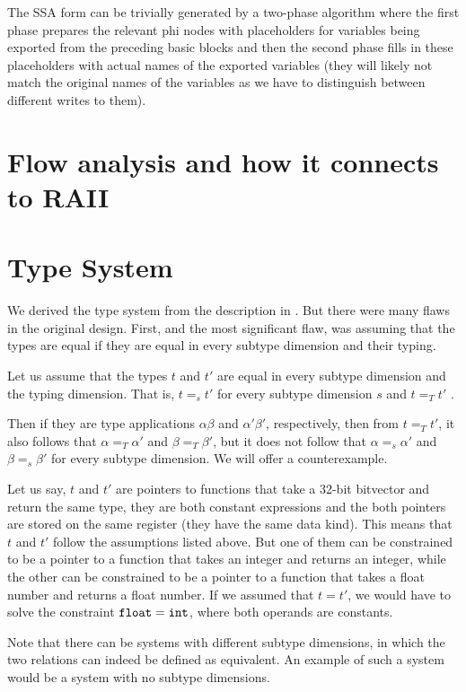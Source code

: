 The SSA form can be trivially generated by a two-phase algorithm where the first phase prepares the relevant phi nodes with placeholders for variables being exported from the preceding basic blocks and then the second phase fills in these placeholders with actual names of the exported variables (they will likely not match the original names of the variables as we have to distinguish between different writes to them).

\section{Flow analysis and how it connects to RAII}

\section{Type System}

We derived the type system from the description in . But there were many flaws in the original design. First, and the most significant flaw, was assuming that the types are equal if they are equal in every subtype dimension and their typing.

\begin{ex}
    Let us assume that the types $t$ and $t'$ are equal in every subtype dimension and the typing dimension. That is, $t =_s t'$ for every subtype dimension $s$ and $t =_T t'$ .

    Then if they are type applications $\alpha \beta$ and $\alpha' \beta'$, respectively, then from $t =_T t'$, it also follows that $\alpha =_T \alpha'$ and $\beta =_T \beta'$, but it does not follow that $\alpha =_s \alpha'$ and $\beta =_s \beta'$ for every subtype dimension. We will offer a counterexample.

    Let us say, $t$ and $t'$ are pointers to functions that take a 32-bit bitvector and return the same type, they are both constant expressions and the both pointers are stored on the same register (they have the same data kind). This means that $t$ and $t'$ follow the assumptions listed above. But one of them can be constrained to be a pointer to a function that takes an integer and returns an integer, while the other can be constrained to be a pointer to a function that takes a float number and returns a float number. If we assumed that $t = t'$, we would have to solve the constraint $\mathtt{float} = \mathtt{int}$, where both operands are constants.

    Note that there can be systems with different subtype dimensions, in which the two relations can indeed be defined as equivalent. An example of such a system would be a system with no subtype dimensions.
\end{ex}

